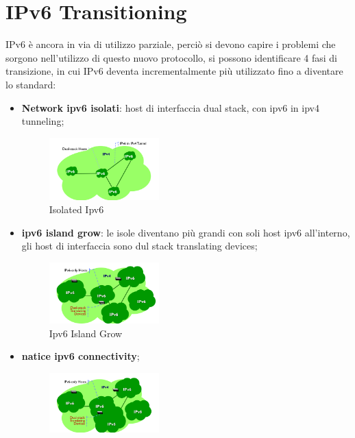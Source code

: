 \documentclass[12pt]{article}
\begin{document}
\newpage
\section{IPv6 Transitioning}
IPv6 \`e ancora in via di utilizzo parziale, perci\`o si devono capire i problemi che sorgono nell'utilizzo di questo nuovo protocollo, si possono identificare 4 fasi di transizione, in cui IPv6 deventa incrementalmente pi\`u utilizzato fino a diventare lo standard:
\begin{itemize}
    \item \textbf{Network ipv6 isolati}: host di interfaccia dual stack, con ipv6 in ipv4 tunneling;
        \begin{figure}[H]
            \centering
            \includegraphics[width=0.4\textwidth]{isolated-ipv6.png}
            \caption{Isolated Ipv6}
            \label{fig:isolated-ipv6}
        \end{figure}
    \item \textbf{ipv6 island grow}: le isole diventano pi\`u grandi con soli host ipv6 all'interno, gli host di interfaccia sono dul stack translating devices;
        \begin{figure}[H]
            \centering
            \includegraphics[width=0.4\textwidth]{ipv6-island-grow.png}
            \caption{Ipv6 Island Grow}
            \label{fig:ipv6-island-grow}
        \end{figure}
    \item \textbf{natice ipv6 connectivity};
        \begin{figure}[H]
            \centering
            \includegraphics[width=0.4\textwidth]{native-ipv6-connectivity.png}

\end{figure}
\end{itemize}
\end{document}

